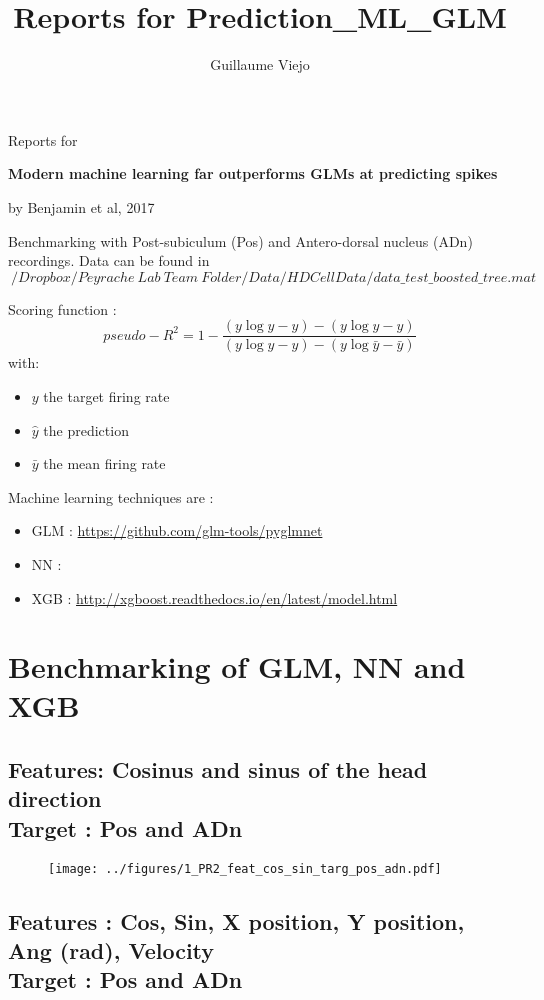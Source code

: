 \documentclass[10pt,a4paper,twocolumn]{article}
\author{Guillaume Viejo}
\title{Reports for Prediction_ML_GLM}
\begin{document}
\onecolumn
Reports for 

\textbf{Modern machine learning far outperforms GLMs at predicting spikes} 

by Benjamin et al, 2017

Benchmarking with Post-subiculum (Pos) and Antero-dorsal nucleus (ADn) recordings. Data can be found in $~/Dropbox/Peyrache\ Lab\ Team\ Folder/Data/HDCellData/data\_test\_boosted\_tree.mat$


Scoring function :
\begin{equation}
	pseudo-R^2 = 1 - \frac{(y \log y - y) - (y \log \hat{y} - \hat{y})}{(y \log y - y) - (y \log \bar{y} - \bar{y})}
\end{equation}
with:
\begin{itemize}
	\item $y$ the target firing rate
	\item $\hat{y}$ the prediction
	\item $\bar{y}$ the mean firing rate
\end{itemize}

Machine learning techniques are :
\begin{itemize}
	\item GLM : \url{https://github.com/glm-tools/pyglmnet}
	\item NN : 
	\item XGB : \url{http://xgboost.readthedocs.io/en/latest/model.html}
\end{itemize}

\tableofcontents

\section{Benchmarking of GLM, NN and XGB}

\twocolumn

\subsection{Features: Cosinus and sinus of the head direction \\ Target : Pos and ADn}


\begin{figure}[H]
	\begin{center}
		\texttt{[image: ../figures/1\_PR2\_feat\_cos\_sin\_targ\_pos\_adn.pdf]} 
	\end{center}
\end{figure}

\subsection{Features : Cos, Sin, X position, Y position, Ang (rad), Velocity \\ Target : Pos and ADn}
\end{document}
